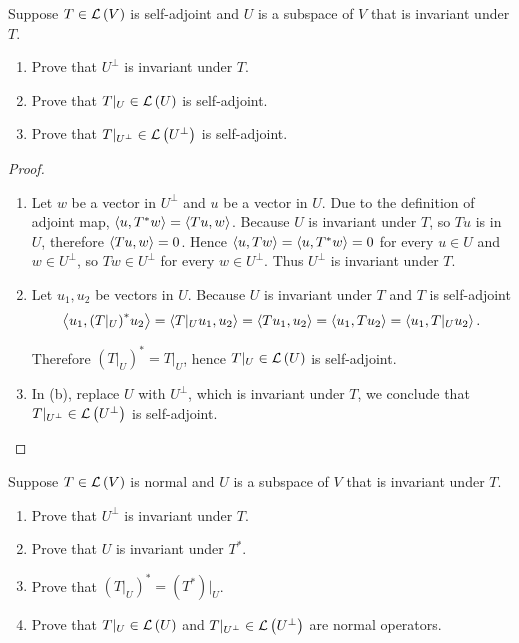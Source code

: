 \begin{exercise}
    Suppose $T \in \mathcal{L}\left({V}\right)$ is self-adjoint and $U$ is a subspace of $V$ that is invariant under $T$.
    \begin{enumerate}[label={(\alph*)}]
        \item Prove that $U^{\bot}$ is invariant under $T$.
        \item Prove that $T\vert_{U}\in \mathcal{L}\left({U}\right)$ is self-adjoint.
        \item Prove that $T\vert_{U^{\bot}}\in \mathcal{L}\left({U^{\bot}}\right)$ is self-adjoint.
    \end{enumerate}
\end{exercise}

\begin{proof}
    \begin{enumerate}[label={(\alph*)}]
        \item Let $w$ be a vector in $U^{\bot}$ and $u$ be a vector in $U$. Due to the definition of adjoint map, $\left\langle{u, T^{*}w}\right\rangle = \left\langle{Tu, w}\right\rangle$. Because $U$ is invariant under $T$, so $Tu$ is in $U$, therefore $\left\langle{Tu, w}\right\rangle = 0$. Hence $\left\langle{u, Tw}\right\rangle = \left\langle{u, T^{*}w}\right\rangle = 0$ for every $u\in U$ and $w\in U^{\bot}$, so $Tw\in U^{\bot}$ for every $w\in U^{\bot}$. Thus $U^{\bot}$ is invariant under $T$.
        \item Let $u_{1}, u_{2}$ be vectors in $U$. Because $U$ is invariant under $T$ and $T$ is self-adjoint
              \[
                  \left\langle{u_{1}, {(T\vert_{U})}^{*}u_{2}}\right\rangle = \left\langle{T\vert_{U}u_{1}, u_{2}}\right\rangle = \left\langle{Tu_{1}, u_{2}}\right\rangle = \left\langle{u_{1}, Tu_{2}}\right\rangle = \left\langle{u_{1}, T\vert_{U}u_{2}}\right\rangle.
              \]

              Therefore ${(T\vert_{U})}^{*} = T\vert_{U}$, hence $T\vert_{U}\in\mathcal{L}\left({U}\right)$ is self-adjoint.
        \item In (b), replace $U$ with $U^{\bot}$, which is invariant under $T$, we conclude that $T\vert_{U^{\bot}}\in \mathcal{L}\left({U^{\bot}}\right)$ is self-adjoint.
    \end{enumerate}
\end{proof}
\newpage

\begin{exercise}
    Suppose $T \in \mathcal{L}\left({V}\right)$ is normal and $U$ is a subspace of $V$ that is invariant under $T$.
    \begin{enumerate}[label={(\alph*)}]
        \item Prove that $U^{\bot}$ is invariant under $T$.
        \item Prove that $U$ is invariant under $T^{*}$.
        \item Prove that ${(T\vert_{U})}^{*} = {(T^{*})\vert_{U}}$.
        \item Prove that $T\vert_{U}\in \mathcal{L}\left({U}\right)$ and $T\vert_{U^{\bot}}\in \mathcal{L}\left({U^{\bot}}\right)$ are normal operators.
    \end{enumerate}
\end{exercise}

